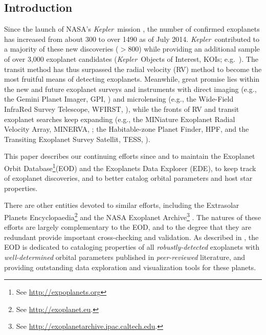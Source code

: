 \documentclass[11pt,preprint]{aastex}
\def\kepler{\textit{Kepler}}
\begin{document}
\begin{CJK*}{UTF8}{gbsn}
\section{Introduction}\label{sec:intro}

Since the launch of NASA's \kepler\ mission \citep{Borucki2010}, the
number of confirmed exoplanets has increased from about 300 to over
1490 as of July 2014. \kepler\ contributed to a majority of these new
discoveries ($> 800$) while providing an additional sample of over
3,000 exoplanet candidates (\kepler\ Objects of Interest, KOIs;
e.g.~\citealt{Batalha2013}). The transit method has thus surpassed the
radial velocity (RV) method to become the most fruitful means of
detecting exoplanets. Meanwhile, great promise lies within the new and
future exoplanet surveys and instruments with direct imaging (e.g.,
the Gemini Planet Imager, GPI, \citealt{Macintosh2014}) and
microlensing (e.g., the Wide-Field InfraRed Survey Telescope, WFIRST,
\citealt{Green2012}), while the fronts of RV and transit exoplanet
searches keep expanding (e.g., the MINiature Exoplanet Radial Velocity
Array, MINERVA, \citealt{Wright2014}; the Habitable-zone Planet Finder,
HPF, \citealt{Mahadevan2012} and the Transiting Exoplanet Survey
Satellit, TESS, \citealt{Ricker2014}).

This paper describes our continuing efforts since \cite{Butler2006}
and \cite{Wright2011} to maintain the Exoplanet Orbit
Database\footnote{See \url{http://expoplanets.org}}(EOD) and the
Exoplanets Data Explorer (EDE), to keep track of exoplanet
discoveries, and to better catalog orbital parameters and host star
properties.

There are other entities devoted to similar efforts,
including the Extrasolar Planets Encyclopaedia\footnote{See
  \url{http://exoplanet.eu}.}  \citep{Schneider2011} and the NASA
Exoplanet Archive\footnote{See
  \url{http://exoplanetarchive.ipac.caltech.edu}.}
\citep{Akeson2013}.  The natures of these efforts are largely
complementary to the EOD, and to the
degree that they are redundant provide important cross-checking and
validation.  As described in \cite{Wright2011}, the EOD is
dedicated to cataloging properties of all \emph{robustly-detected} exoplanets with
\emph{well-determined} orbital parameters published in
\emph{peer-reviewed} literature, and providing outstanding data
exploration and visualization tools for these planets.


\end{CJK*}
\end{document}
